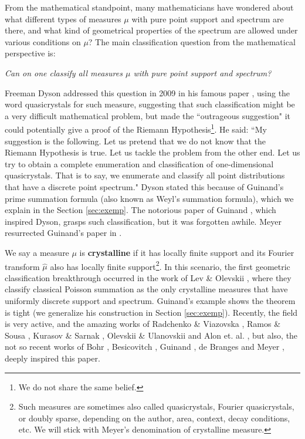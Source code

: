 \documentclass[a4paper,reqno,12pt]{amsart}
\newcommand{\ft}{\widehat}
\newcommand{\1}{{\bf 1}}
\renewcommand{\emph}[1]{{\bf #1}}
\renewcommand{\1}{{\bo 1}}
\begin{document}
From the mathematical standpoint, many mathematicians have wondered about what different types of measures $\mu$ with pure point support and spectrum are there, and what kind of geometrical properties of the spectrum are allowed under various conditions on $\mu$? The main classification question from the mathematical perspective is:
\begin{center}
\it Can on one classify all measures $\mu$ with pure point support and spectrum?
\end{center}
Freeman Dyson addressed this question in 2009 in his famous paper \cite{Dy}, using the word quasicrystals for such measure,  suggesting that such classification might be a very difficult mathematical problem, but made the ``outrageous suggestion" it could potentially give a proof of the Riemann Hypothesis\footnote{We do not share the same belief.}. He said: ``My suggestion is the following. Let us pretend that we do not know that the Riemann Hypothesis is true. Let us tackle the problem from the other end. Let us try to obtain a complete enumeration and classification of one-dimensional quasicrystals. That is to say, we enumerate and classify all point distributions that have a discrete point spectrum."  Dyson stated this because of Guinand's prime summation formula (also known as Weyl's summation formula), which we explain in the Section \ref{sec:exemp}. The notorious paper of Guinand \cite{Gui}, which inspired Dyson, grasps such classification, but it was forgotten awhile. Meyer resurrected Guinand's paper in \cite{Me16}.
 


We say a measure $\mu$ is \emph{crystalline} if it has locally finite support and its Fourier transform $\ft \mu$ also has locally finite support\footnote{Such measures are sometimes also called quasicrystals, Fourier quasicrystals, or doubly sparse, depending on the author, area, context, decay conditions, etc. We will stick with Meyer's denomination of crystalline measure.}. In this scenario, the first geometric classification breakthrough occurred in the work of Lev \& Olevskii \cite{LO,LO2}, where they classify classical Poisson summation as the only crystalline measures that have uniformly discrete support and spectrum. Guinand's example \cite[p. 265]{Gui} shows the theorem is tight (we generalize his construction in Section \ref{sec:exemp}). Recently, the field is very active, and the amazing works of Radchenko \& Viazovska \cite{RV},  Ramos \& Sousa \cite{RS1}, Kurasov \& Sarnak \cite{KS}, Olevskii \& Ulanovskii \cite{OU} and Alon et. al. \cite{AV,ACV}, but also, the not so recent works of Bohr \cite{Bo}, Besicovitch \cite{Be}, Guinand \cite{Gui}, de Branges \cite{dB} and Meyer \cite{Me}, deeply inspired this paper.
\end{document}
